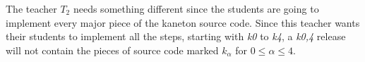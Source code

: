 The teacher $T_{2}$ needs something different since the students are going
to implement every major piece of the kaneton source code. Since this teacher
wants their students to implement all the steps, starting with \textit{k0}
to \textit{k4}, a \textit{k0,4} release will not contain the pieces of source
code marked $k_{\alpha}$ for $0 \le \alpha \le 4$.
